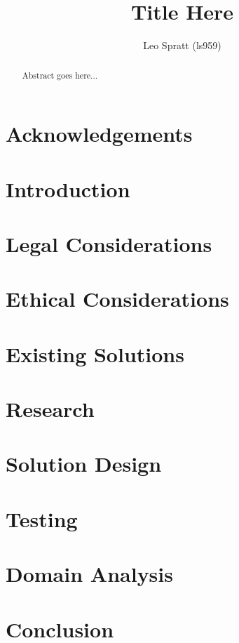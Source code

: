 \documentclass[a4paper,12pt]{report}
\title{
    {Title Here}\\
}
\author{Leo Spratt (ls959)}
\begin{document}
\maketitle

\begin{abstract}
    Abstract goes here...
\end{abstract}
\chapter{Acknowledgements}
% 
\tableofcontents
\newpage
\listoffigures
\newpage
\listoftables
\newpage
\lstlistoflistings
\newpage
\chapter{Introduction}

\chapter{Legal Considerations}
\chapter{Ethical Considerations}
\chapter{Existing Solutions}

\chapter{Research}

\chapter{Solution Design}

\chapter{Testing}

\chapter{Domain Analysis}

\chapter{Conclusion}

\end{document}
